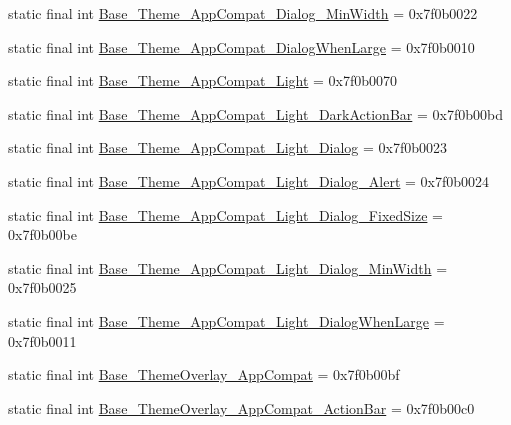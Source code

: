 \begin{CompactItemize}
\item 
static final int \hyperlink{classandroid_1_1support_1_1graphics_1_1drawable_1_1_r_1_1style_25b7a6e7c9093682a069fd8a00e3740e}{Base\_\-Theme\_\-AppCompat\_\-Dialog\_\-MinWidth} = 0x7f0b0022
\item 
static final int \hyperlink{classandroid_1_1support_1_1graphics_1_1drawable_1_1_r_1_1style_4edd0517b3f7cf1ac870c6b1dec333e1}{Base\_\-Theme\_\-AppCompat\_\-DialogWhenLarge} = 0x7f0b0010
\item 
static final int \hyperlink{classandroid_1_1support_1_1graphics_1_1drawable_1_1_r_1_1style_15eca1e6e8d303964d1beb24969596a8}{Base\_\-Theme\_\-AppCompat\_\-Light} = 0x7f0b0070
\item 
static final int \hyperlink{classandroid_1_1support_1_1graphics_1_1drawable_1_1_r_1_1style_52629137699647a0f29bedbcfe35900e}{Base\_\-Theme\_\-AppCompat\_\-Light\_\-DarkActionBar} = 0x7f0b00bd
\item 
static final int \hyperlink{classandroid_1_1support_1_1graphics_1_1drawable_1_1_r_1_1style_f1554437cdc958b085a1c7129ef979ee}{Base\_\-Theme\_\-AppCompat\_\-Light\_\-Dialog} = 0x7f0b0023
\item 
static final int \hyperlink{classandroid_1_1support_1_1graphics_1_1drawable_1_1_r_1_1style_112297f074564fa93df69499a26c3514}{Base\_\-Theme\_\-AppCompat\_\-Light\_\-Dialog\_\-Alert} = 0x7f0b0024
\item 
static final int \hyperlink{classandroid_1_1support_1_1graphics_1_1drawable_1_1_r_1_1style_43818f339a54f40712b4d5a7b0613239}{Base\_\-Theme\_\-AppCompat\_\-Light\_\-Dialog\_\-FixedSize} = 0x7f0b00be
\item 
static final int \hyperlink{classandroid_1_1support_1_1graphics_1_1drawable_1_1_r_1_1style_38d14ea6ecab4f2d25fce2a7c103aad3}{Base\_\-Theme\_\-AppCompat\_\-Light\_\-Dialog\_\-MinWidth} = 0x7f0b0025
\item 
static final int \hyperlink{classandroid_1_1support_1_1graphics_1_1drawable_1_1_r_1_1style_f3fe9b8609ff92203cde653a094bb367}{Base\_\-Theme\_\-AppCompat\_\-Light\_\-DialogWhenLarge} = 0x7f0b0011
\item 
static final int \hyperlink{classandroid_1_1support_1_1graphics_1_1drawable_1_1_r_1_1style_9521b082ef2581ae64114f35e4687e0f}{Base\_\-ThemeOverlay\_\-AppCompat} = 0x7f0b00bf
\item 
static final int \hyperlink{classandroid_1_1support_1_1graphics_1_1drawable_1_1_r_1_1style_fa77710de19bb22680925f3b47548305}{Base\_\-ThemeOverlay\_\-AppCompat\_\-ActionBar} = 0x7f0b00c0
\item 

\end{CompactItemize}
